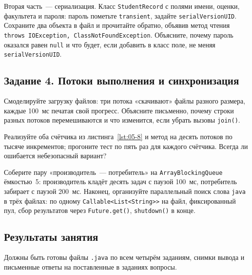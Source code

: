 Вторая часть~--- сериализация. Класс \texttt{StudentRecord} с полями имени,
оценки, факультета и пароля: пароль пометьте \texttt{transient}, задайте
\texttt{serialVersionUID}. Сохраните два объекта в файл и прочитайте обратно,
объявив метод чтения \texttt{throws IOException, ClassNotFoundException}.
Объясните, почему пароль оказался равен \texttt{null} и что будет, если добавить
в класс поле, не меняя \texttt{serialVersionUID}.

\subsection*{Задание 4. Потоки выполнения и синхронизация}

Смоделируйте загрузку файлов: три потока «скачивают» файлы разного размера,
каждые 100~мс печатая свой прогресс. Объясните письменно, почему строки разных
потоков перемешиваются и что изменится, если убрать вызовы \texttt{join()}.

Реализуйте оба счётчика из листинга~\ref{lst:05-8} и метод на десять потоков по
тысяче инкрементов; прогоните тест по пять раз для каждого счётчика. Всегда ли
ошибается небезопасный вариант?

Соберите пару «производитель~--- потребитель» на \texttt{ArrayBlockingQueue}
ёмкостью~5: производитель кладёт десять задач с паузой 100~мс, потребитель
забирает с паузой 200~мс. Наконец, организуйте параллельный поиск слова
\texttt{java} в трёх файлах: по одному \texttt{Callable<List<String>>} на файл,
фиксированный пул, сбор результатов через \texttt{Future.get()},
\texttt{shutdown()} в конце.

\subsection*{Результаты занятия}

Должны быть готовы файлы \texttt{.java} по всем четырём заданиям, снимки вывода
и письменные ответы на поставленные в заданиях вопросы.

\kontrolvoprosy


